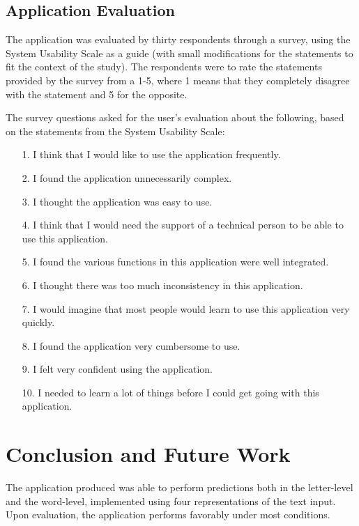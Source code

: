 \documentclass[journal]{./IEEE/IEEEtran}
\begin{document}
\subsection{Application Evaluation}
The application was evaluated by thirty respondents through a survey, using the System Usability Scale as a guide (with small modifications for the statements to fit the context of the study). The respondents were to rate the statements provided by the survey from a 1-5, where 1 means that they completely disagree with the statement and 5 for the opposite.

The survey questions asked for the user's evaluation about the following, based on the statements from the System Usability Scale\cite{UsabilityGeeks}:

\begin{enumerate}{}

\item[1.] I think that I would like to use the application frequently.

\item[2.] I found the application unnecessarily complex.

\item[3.] I thought the application was easy to use.

\item[4.] I think that I would need the support of a technical person to be able to use this application.

\item[5.] I found the various functions in this application were well integrated.

\item[6.] I thought there was too much inconsistency in this application.

\item[7.] I would imagine that most people would learn to use this application very quickly.

\item[8.] I found the application very cumbersome to use.

\item[9.] I felt very confident using the application.

\item[10.] I needed to learn a lot of things before I could get going with this application.


\end{enumerate}

\section{Conclusion and Future Work}
The application produced was able to perform predictions both in the letter-level and the word-level, implemented using four representations of the text input. Upon evaluation, the application performs favorably under most conditions.
\end{document}
